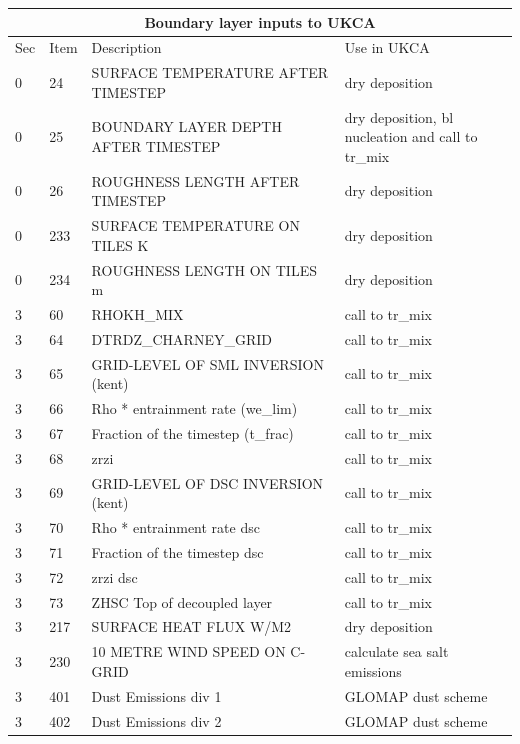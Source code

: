 \documentclass{UMDP_article}
\begin{document}
\begin{table}[htp]
  \begin{center}
    \begin{tabular}{|p{0.5cm}|p{0.7cm}|p{6cm}|p{6cm}|}
      \hline
      \multicolumn{4}{|c|}{Boundary layer inputs to UKCA} \\
      \hline
      Sec   &  Item   &  Description   & Use in UKCA \\
      \hline
      0 & 24   & SURFACE TEMPERATURE AFTER TIMESTEP  &  dry deposition \\
      0 & 25   & BOUNDARY LAYER DEPTH AFTER TIMESTEP &  dry deposition, bl nucleation and call to tr\_mix \\
      0 & 26   & ROUGHNESS LENGTH AFTER TIMESTEP  &  dry deposition \\
      0 & 233  & SURFACE TEMPERATURE ON TILES K  &  dry deposition \\
      0 & 234  & ROUGHNESS LENGTH ON TILES m  &  dry deposition \\ 
      3 & 60   & RHOKH\_MIX &  call to tr\_mix \\
      3 & 64   & DTRDZ\_CHARNEY\_GRID &  call to tr\_mix \\
      3 & 65   & GRID-LEVEL OF SML INVERSION (kent) &  call to tr\_mix \\
      3 & 66   & Rho * entrainment rate (we\_lim) &  call to tr\_mix \\
      3 & 67   & Fraction of the timestep (t\_frac) &  call to tr\_mix \\
      3 & 68   & zrzi &  call to tr\_mix \\
      3 & 69   & GRID-LEVEL OF DSC INVERSION (kent) &  call to tr\_mix \\
      3 & 70   & Rho * entrainment rate dsc &  call to tr\_mix \\
      3 & 71   & Fraction of the timestep dsc &  call to tr\_mix \\
      3 & 72   & zrzi dsc &  call to tr\_mix \\
      3 & 73   & ZHSC Top of decoupled layer &  call to tr\_mix \\
      3 & 217  & SURFACE HEAT FLUX W/M2 &  dry deposition \\
      3 & 230  & 10 METRE WIND SPEED ON C-GRID & calculate sea salt emissions \\
      3 & 401  & Dust Emissions div 1  & GLOMAP dust scheme \\
      3 & 402  & Dust Emissions div 2  & GLOMAP dust scheme \\

\end{tabular}
\end{center}
\end{table}
\end{document}
